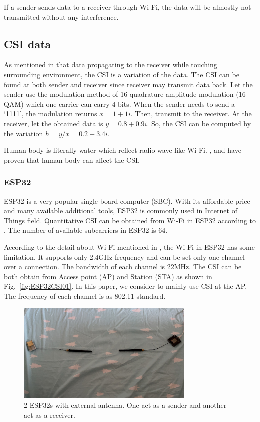 \documentclass[10pt,letterpaper]{article}
\begin{document}
	If a sender sends data to a receiver through Wi-Fi, the data will be almostly not transmitted without any interference.
	
	
	
	\subsection*{CSI data}\label{CSI}
	As mentioned in  that data propagating to the receiver while touching surrounding environment, the CSI is a variation of the data. The CSI can  be found at both sender and receiver since receiver may transmit data back. Let the sender use the modulation method of 16-quadrature amplitude modulation (16-QAM) which one carrier can carry 4 bits. When the sender needs to send a `1111', the modulation returns $x=1+1i$. Then, transmit to the receiver. At the receiver, let the obtained data is $y=0.8+0.9i$. So, the CSI can be computed by the variation $h=y/x=0.2+3.4i$.
	
	Human body is literally water which reflect radio wave like Wi-Fi. \cite{wangF}, \cite{liuJ} and \cite{chowdhuryTZ} have proven that human body can affect the CSI.
	
	\subsubsection*{ESP32}\label{ESP32}
	ESP32 is a very popular single-board computer (SBC). With its affordable price and many available additional tools, ESP32 is commonly used in Internet of Things field.  Quantitative CSI can be obtained from Wi-Fi in ESP32 according to \cite{atifM}. The number of available subcarriers in ESP32 is 64.
	
	According to the detail about Wi-Fi mentioned in , the Wi-Fi in ESP32 has some limitation. It supports only 2.4GHz frequency and can be set only one channel over a connection. The bandwidth of each channel is 22MHz. The CSI can be both obtain from Access point (AP) and Station (STA) as shown in Fig.~\ref{fig:ESP32CSI01}.  In this paper, we consider to mainly use CSI at the AP.
	The frequency of each channel is as 802.11 standard.
	
	
	\begin{figure}[htbp]
		\centerline{\includegraphics[width=85mm,scale=0.5]{ESP32.jpg}}
		\caption{2 ESP32s with external antenna. One act as a sender and another act as a receiver.}
		\label{fig:ESP32}
	\end{figure}
	
\end{document}

